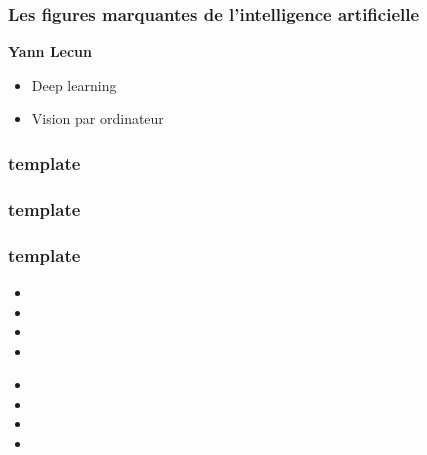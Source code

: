 \documentclass{formation}
\begin{document}
\begin{frame}
  \frametitle{Les figures marquantes de l'intelligence artificielle}
  \textbf{Yann Lecun}
  \begin{itemize}
  \item Deep learning
  \item Vision par ordinateur
  \end{itemize}
\end{frame}


\begin{frame}
  \frametitle{template}
\end{frame}

\begin{frame}
  \frametitle{template}
\end{frame}

\begin{frame}
  \frametitle{template}

  
  \begin{itemize}
  \item 
  \item 
  \item 
  \item 
  \end{itemize}

  \begin{minipage}[l]{0.49\linewidth}
  \end{minipage}\hfill
  \begin{minipage}[l]{0.49\linewidth}
  \end{minipage}\hfill

  \begin{minipage}[l]{0.49\linewidth}
      \begin{itemize}
      \item 
      \item 
      \item 
      \item 
      \end{itemize}
  \end{minipage}\hfill
  \begin{minipage}[l]{0.49\linewidth}
  \end{minipage}\hfill

\end{frame}
\end{document}
